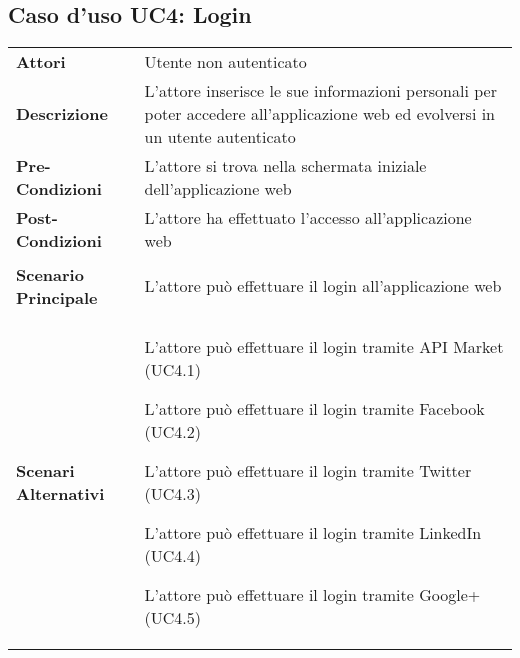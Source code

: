 \subsection{Caso d'uso UC4: Login}
\label{UC4}

\begin{longtable}{ l | p{11cm}}
	\hline
	\rowcolor{Gray}
	 \multicolumn{2}{c}{UC4 - Login}\\
	 \hline
	\textbf{Attori} & Utente non autenticato \\
	\textbf{Descrizione} & L'attore inserisce le sue informazioni personali per poter accedere all'applicazione web ed evolversi in un utente autenticato \\
	\textbf{Pre-Condizioni} & L'attore si trova nella schermata iniziale dell'applicazione web \\
	\textbf{Post-Condizioni} & L'attore ha effettuato l'accesso all'applicazione web \\
	\textbf{Scenario Principale} & 
	\begin{enumerate*}[label=(\arabic*.),itemjoin={\newline}]
		\item L'attore può effettuare il login all'applicazione web
	\end{enumerate*}\\
	\textbf{Scenari Alternativi} & 
	\begin{enumerate*}[label=(\arabic*.),itemjoin={\newline}]
		\item L'attore può effettuare il login tramite API Market (UC4.1)
		\item L'attore può effettuare il login tramite Facebook (UC4.2)
		\item L'attore può effettuare il login tramite Twitter (UC4.3)
		\item L'attore può effettuare il login tramite LinkedIn (UC4.4)
		\item L'attore può effettuare il login tramite Google+ (UC4.5)
	\end{enumerate*}\\
\end{longtable}